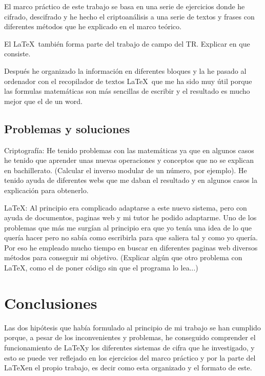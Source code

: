 \documentclass{article}
\begin{document}
El marco práctico de este trabajo se basa en una serie de ejercicios donde he cifrado, descifrado y he hecho el criptoanálisis a una serie de textos y frases con diferentes métodos que he explicado en el marco teórico.

El \LaTeX $\,$ también forma parte del trabajo de campo del TR. Explicar en que consiste.

Después he organizado la información en diferentes bloques y la he pasado al ordenador con el recopilador de textos \LaTeX $\,$ que me ha sido muy útil porque las formulas matemáticas son más sencillas de escribir y el resultado es mucho mejor que el de un word. 

\subsection{Problemas y soluciones}

Criptografía: He tenido problemas con las matemáticas ya que en algunos casos he tenido que aprender unas nuevas operaciones y conceptos que no se explican en bachillerato. (Calcular el inverso modular de un número, por ejemplo). He tenido ayuda de diferentes webs que me daban el resultado y en algunos casos la explicación para obtenerlo. 

\LaTeX: Al principio era complicado adaptarse a este nuevo sistema, pero con ayuda de documentos, paginas web y mi tutor he podido adaptarme. Uno de los problemas que más me surgían al principio era que yo tenía una idea de lo que quería hacer pero no sabía como escribirla para que saliera tal y como yo quería. Por eso he empleado mucho tiempo en buscar en diferentes paginas web diversos métodos para conseguir mi objetivo. 
(Explicar algún que otro problema con \LaTeX, como el de poner código sin que el programa lo lea...)

\section{Conclusiones}

Las dos hipótesis que había formulado al principio de mi trabajo se han cumplido porque, a pesar de los inconvenientes y problemas, he conseguido comprender el funcionamiento de \LaTeX y los diferentes sistemas de cifra que he investigado, y esto se puede ver reflejado en los ejercicios del marco práctico y por la parte del \LaTeX en el propio trabajo, es decir como esta organizado y el formato de este.
\end{document}
